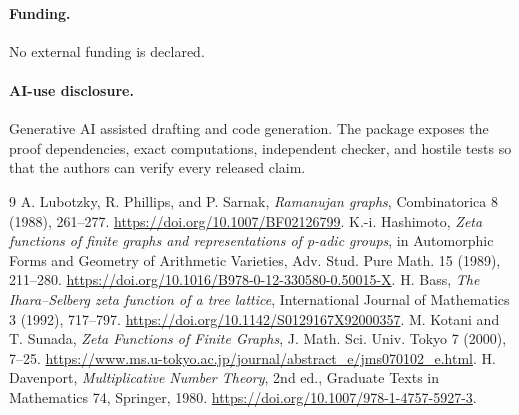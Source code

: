 \documentclass[10pt]{article}
\begin{document}
\paragraph{Funding.}
No external funding is declared.
\paragraph{AI-use disclosure.}
Generative AI assisted drafting and code generation. The package exposes the
proof dependencies, exact computations, independent checker, and hostile
tests so that the authors can verify every released claim.
\fi

\begin{thebibliography}{9}\small
{} A. Lubotzky, R. Phillips, and P. Sarnak,
\emph{Ramanujan graphs}, Combinatorica 8 (1988), 261--277.
\url{https://doi.org/10.1007/BF02126799}.
 K.-i. Hashimoto,
\emph{Zeta functions of finite graphs and representations of p-adic groups},
in Automorphic Forms and Geometry of Arithmetic Varieties,
Adv. Stud. Pure Math. 15 (1989), 211--280.
\url{https://doi.org/10.1016/B978-0-12-330580-0.50015-X}.
 H. Bass, \emph{The Ihara--Selberg zeta function of a tree
lattice}, International Journal of Mathematics 3 (1992), 717--797.
\url{https://doi.org/10.1142/S0129167X92000357}.
 M. Kotani and T. Sunada,
\emph{Zeta Functions of Finite Graphs}, J. Math. Sci. Univ. Tokyo 7
(2000), 7--25.
\url{https://www.ms.u-tokyo.ac.jp/journal/abstract_e/jms070102_e.html}.
 H. Davenport, \emph{Multiplicative Number Theory},
2nd ed., Graduate Texts in Mathematics 74, Springer, 1980.
\url{https://doi.org/10.1007/978-1-4757-5927-3}.
\end{thebibliography}
\end{document}
